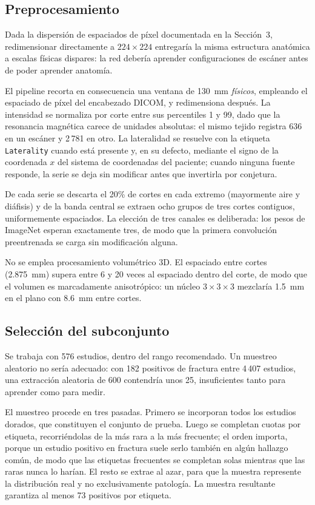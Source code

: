 \documentclass{article}
\begin{document}
\subsection{Preprocesamiento}

Dada la dispersión de espaciados de píxel documentada en la Sección~3,
redimensionar directamente a $224\times224$ entregaría la misma estructura
anatómica a escalas físicas dispares: la red debería aprender configuraciones de
escáner antes de poder aprender anatomía.

El pipeline recorta en consecuencia una ventana de 130~mm \emph{físicos},
empleando el espaciado de píxel del encabezado DICOM, y redimensiona después. La
intensidad se normaliza por corte entre sus percentiles 1 y 99, dado que la
resonancia magnética carece de unidades absolutas: el mismo tejido registra 636
en un escáner y 2\,781 en otro. La lateralidad se resuelve con la etiqueta
\texttt{Laterality} cuando está presente y, en su defecto, mediante el signo de la
coordenada $x$ del sistema de coordenadas del paciente; cuando ninguna fuente
responde, la serie se deja sin modificar antes que invertirla por conjetura.

De cada serie se descarta el 20\% de cortes en cada extremo (mayormente aire y
diáfisis) y de la banda central se extraen ocho grupos de tres cortes
contiguos, uniformemente espaciados. La elección de tres canales es deliberada:
los pesos de ImageNet esperan exactamente tres, de modo que la primera
convolución preentrenada se carga sin modificación alguna.

No se emplea procesamiento volumétrico 3D. El espaciado entre cortes (2.875~mm)
supera entre 6 y 20 veces al espaciado dentro del corte, de modo que el volumen
es marcadamente anisotrópico: un núcleo $3\times3\times3$ mezclaría 1.5~mm en el
plano con 8.6~mm entre cortes.

\subsection{Selección del subconjunto}

Se trabaja con 576 estudios, dentro del rango recomendado. Un muestreo aleatorio
no sería adecuado: con 182 positivos de fractura entre 4\,407 estudios, una
extracción aleatoria de 600 contendría unos 25, insuficientes tanto para aprender
como para medir.

El muestreo procede en tres pasadas. Primero se incorporan todos los estudios
dorados, que constituyen el conjunto de prueba. Luego se completan cuotas por
etiqueta, recorriéndolas de la más rara a la más frecuente; el orden importa,
porque un estudio positivo en fractura suele serlo también en algún hallazgo
común, de modo que las etiquetas frecuentes se completan solas mientras que las
raras nunca lo harían. El resto se extrae al azar, para que la muestra represente
la distribución real y no exclusivamente patología. La muestra resultante
garantiza al menos 73 positivos por etiqueta.
\end{document}
